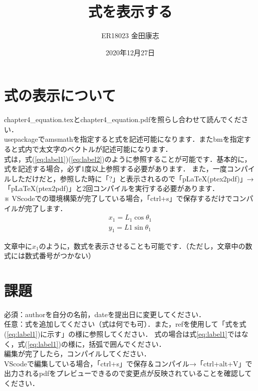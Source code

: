 \documentclass[a4paper,10pt]{jsarticle}
\title{式を表示する}%
\author{ER18023 金田康志}%
\date{2020年12月27日}%
\begin{document}
\maketitle%
\section{式の表示について}
chapter4\_equation.texとchapter4\_equation.pdfを照らし合わせて読んでください．\\

usepackageでamsmathを指定すると式を記述可能になります．またbmを指定すると式内で太文字のベクトルが記述可能になります．\\

式は，式(\ref{eq:label1})(\ref{eq:label2})のように参照することが可能です．基本的に，式を記述する場合，必ず1度以上参照する必要があります．
また，一度コンパイルしただけだと，参照した時に「?」と表示されるので「pLaTeX(ptex2pdf)」→「pLaTeX(ptex2pdf)」と2回コンパイルを実行する必要があります．\\
※ VScodeでの環境構築が完了している場合，「ctrl+s」で保存するだけでコンパイルが完了します．
\begin{gather}
    x_{1} = L_{1} \cos \theta_{1} 
    \label{eq:label1} \\
    y_{1} = L{1}\sin \theta_{1} 
    \label{eq:label2}
\end{gather}

文章中に$x_1$のように，数式を表示させることも可能です．（ただし，文章中の数式には数式番号がつかない）
\section{課題}
\noindent 必須：authorを自分の名前，dateを提出日に変更してください．\\
任意：式を追加してください（式は何でも可）．また，refを使用して「式を式(\ref{eq:label1})に示す」の様に参照してください．
式の場合は式\ref{eq:label1}ではなく，式(\ref{eq:label1})の様に，括弧で囲んでください．\\

\noindent 編集が完了したら，コンパイルしてください．\\
VScodeで編集している場合，「ctrl+s」で保存＆コンパイル→「ctrl+alt+V」で出力されるpdfをプレビューできるので変更点が反映されていることを確認してください．\\
\end{document}
